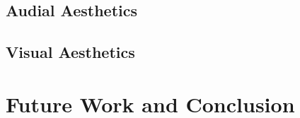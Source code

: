 \documentclass{article}
\begin{document}
\subsection{Audial Aesthetics}

\subsection{Visual Aesthetics}

\section{Future Work and Conclusion}



\end{document}
